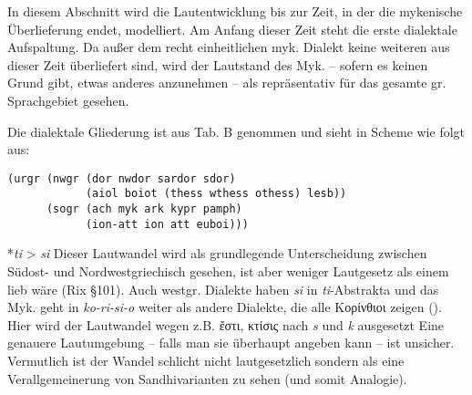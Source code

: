 \documentclass[12pt,a4paper,normalheadings]{scrartcl}
\newcounter{para}
\newcommand{\mypara}[1]{\vspace{1em}\par\noindent\refstepcounter{para}%
\textbf{\textsf{\thepara}}\enspace\textsf{#1}\quad}
\def\rek#1{*\textit{#1}}
\def\bel#1{\textit{#1}}
\begin{document}
In diesem Abschnitt wird die Lautentwicklung bis zur Zeit,
in der die mykenische Überlieferung endet, modelliert.
Am Anfang dieser Zeit steht die erste dialektale Aufspaltung.
Da außer dem recht einheitlichen myk. Dialekt keine weiteren aus dieser
Zeit überliefert sind,
wird der Lautstand des Myk.
-- sofern es keinen Grund gibt, etwas anderes anzunehmen --
als repräsentativ für das gesamte gr. Sprachgebiet gesehen.

Die dialektale Gliederung ist aus \cite{bart_frueh} Tab. B genommen
und sieht in Scheme wie folgt aus:
\begin{verbatim}
(urgr (nwgr (dor nwdor sardor sdor)
            (aiol boiot (thess wthess othess) lesb))
      (sogr (ach myk ark kypr pamph)
            (ion-att ion att euboi)))
\end{verbatim}

\mypara{\rek{ti} > \bel{si}}
Dieser Lautwandel wird als grundlegende Unterscheidung zwischen Südost-
und Nordwestgriechisch gesehen,
ist aber weniger Lautgesetz als einem lieb wäre (Rix §101).
Auch westgr. Dialekte haben \bel{si} in \emph{ti}-Abstrakta
und das Myk. geht in \bel{ko-ri-si-o} weiter als andere Dialekte,
die alle Κορίνθιοι zeigen (\cite[144]{bart_hand}).
Hier wird der Lautwandel wegen z.B. ἔστι, κτίσις
nach \bel{s} und \bel{k} ausgesetzt
Eine genauere Lautumgebung -- falls man sie überhaupt angeben kann --
ist unsicher.
Vermutlich ist der Wandel schlicht nicht lautgesetzlich
sondern als eine Verallgemeinerung von Sandhivarianten zu sehen
(und somit Analogie).

\printbibliography
\end{document}
